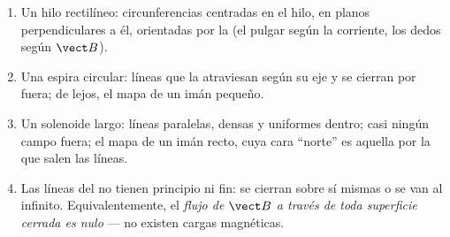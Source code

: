 \begin{proposition}\label{prop:b1:magnetostatics:maps}
\begin{enumerate}
  \item Un hilo rectilíneo: circunferencias centradas en el hilo, en
        planos perpendiculares a él, orientadas por la \emph{} (el pulgar según la corriente, los dedos según $\vect B$).
  \item Una espira circular: líneas que la atraviesan según su eje y se
        cierran por fuera; de lejos, el mapa de un imán pequeño.
  \item Un solenoide largo: líneas paralelas, densas y uniformes dentro;
        casi ningún campo fuera; el mapa de un imán recto, cuya cara
        ``norte'' es aquella por la que salen las líneas.
  \item Las líneas del  no tienen principio ni fin: se
        cierran sobre sí mismas o se van al infinito. Equivalentemente,
        el \emph{flujo de $\vect B$ a través de toda superficie cerrada es
        nulo} --- no existen cargas magnéticas.
\end{enumerate}
\end{proposition}
\admitted

